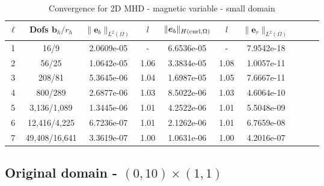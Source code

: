 \documentclass{article}
\newcommand{\uu}[1]{\boldsymbol #1}
\begin{document}
\begin{table}[h!]
\begin{center}
\begin{tabular}{cccccccccc}
\hline
\hline
$\ell$ &    Dofs $\uu{b}_h/r_h$ & $\|\uu{e}_b\|_{L^2(\Omega)}$ & $l$ & $\|\uu{e}_b\|_{H({\rm curl},\Omega)}$ & $l$ &$\|\uu{e}_r\|_{L^2(\Omega)}$ \\
\hline\hline

 1 &     16/9 &  2.0609e-05 &     - &  6.6536e-05 &        - & 7.9542e-18 \\
 2 &     56/25 &  1.0642e-05 &     1.06 &  3.3834e-05 &        1.08 & 1.0057e-11 \\
 3 &    208/81 &  5.3645e-06 &     1.04 &  1.6987e-05 &        1.05 & 7.6667e-11 \\
 4 &    800/289 &  2.6877e-06 &     1.03 &  8.5022e-06 &        1.03 & 4.6064e-10 \\
 5 &   3,136/1,089 &  1.3445e-06 &     1.01 &  4.2522e-06 &        1.01 & 5.5048e-09 \\
 6 &  12,416/4,225 &  6.7236e-07 &     1.01 &  2.1262e-06 &        1.01 & 6.7659e-08 \\
 7 &  49,408/16,641 &  3.3619e-07 &     1.00 &  1.0631e-06 &        1.00 & 4.2016e-07 \\
\hline\hline

\end{tabular}
\caption{Convergence for 2D MHD  - magnetic variable - small domain}
\label{tab:MHD_2D_smooth_magnetic}
\end{center}
\end{table}


\newpage

\subsection*{Original domain - $(0,10)\times(1,1)$}
\end{document}
